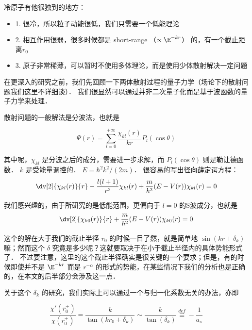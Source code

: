 
冷原子有他很独到的地方：
\begin{itemize}
\item 1. 很冷，所以粒子动能很低，我们只需要一个低能理论
\item 2. 相互作用很弱，很多时候都是 short-range （$\propto \E^{-kr}$） 的，有一个截止距离$r_0$
\item 3. 原子非常稀薄，可以暂时不使用多体理论，而是使用少体散射解决一定问题
\end{itemize}

在更深入的研究之前，我们先回顾一下两体散射过程的量子力学（场论下的散射问题我们这里不详细谈）． 我们很显然可以通过并非二次量子化而是基于波函数的量子力学来处理．

散射问题的一般解法是分波法，也就是

\begin{equation}
\Psi(r) = \sum_{l=0}^{+\infty}\frac{\chi_{kl}(r)}{kr}P_l(\cos\theta) 
\end{equation}

其中呢，$\chi_{kl}$ 是分波之后的成分，需要进一步求解，而 $P_l(\cos\theta)$ 则是勒让德函数． $k$ 是受能量调控的． $E=\hbar^2 k^2/(2m)$． 很容易的写出径向薛定谔方程：
\begin{equation}
\dv[2]{\chi_{kl}(r)}{r} - \frac{l(l+1)}{r^2}\chi_{kl}(r) + \frac{m}{\hbar^2}(E-V(r))\chi_{kl}(r) = 0
\end{equation}

我们感兴趣的，由于所研究的是低能范围，更偏向于 $l=0$ 的S波成分，也就是
\begin{equation}
\dv[2]{\chi_{k0}(r)}{r}+ \frac{m}{\hbar^2}(E-V(r))\chi_{k0}(r) = 0
\end{equation}

这个的解在大于我们的截止半径 $r_0$ 的时候一目了然，就是简单地 $\sin(kr + \delta_k)$ 嘛；然而这个 $\delta$ 究竟是多少呢？这就要取决于在小于截止半径内的具体势能形式了． 不过要注意，这里的这个截止半径确实是很关键的一个要求；但是，有的时候即使并不是 $\E^{-kr}$ 而是 $r^{-\alpha}$ 的形式的势能，在某些情况下我们的分析也是正确的，在本文的后半部分会涉及这一点．

关于这个 $\delta_k$ 的研究，我们实际上可以通过一个与归一化系数无关的办法，亦即

\begin{equation}
\frac{\chi'(r_0^+)}{\chi(r_0^+)} = \frac{k}{\tan(k r_0 +\delta_k)} \sim \frac{k}{\tan(\delta_k)} \overset{def}{\equiv} -\frac{1}{a_s} 
\end{equation}

